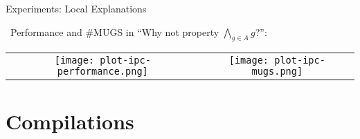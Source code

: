 \begin{frame}{Experiments: Local Explanations}

\notesym~Performance and \#MUGS 
in ``Why not property $\bigwedge_{g \in A} g$?'':

\medskip

\small

\centering

\begin{tabular}{cc}
\begin{minipage}{0.45\textwidth}
\texttt{[image: plot-ipc-performance.png]}
\end{minipage} &
\hspace{0.5cm} \begin{minipage}{0.45\textwidth}
\texttt{[image: plot-ipc-mugs.png]}
\end{minipage}
\end{tabular}

\end{frame}



%

\section[Compilations]{Compilations}
\subsection*{}

